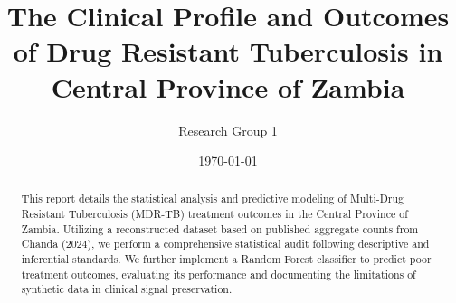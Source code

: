 \documentclass[12pt,a4paper]{report}
\title{The Clinical Profile and Outcomes of Drug Resistant Tuberculosis in Central Province of Zambia}
\author{Research Group 1}
\date{\today}
\begin{document}
\maketitle

\begin{abstract}
This report details the statistical analysis and predictive modeling of Multi-Drug Resistant Tuberculosis (MDR-TB) treatment outcomes in the Central Province of Zambia. Utilizing a reconstructed dataset based on published aggregate counts from Chanda (2024), we perform a comprehensive statistical audit following descriptive and inferential standards. We further implement a Random Forest classifier to predict poor treatment outcomes, evaluating its performance and documenting the limitations of synthetic data in clinical signal preservation.
\end{abstract}

\tableofcontents







\end{document}
